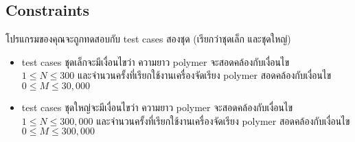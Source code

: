 \subsection*{\sectionfont\upshape Constraints}

โปรแกรมของคุณจะถูกทดสอบกับ test cases สองชุด (เรียกว่าชุดเล็ก และชุดใหญ่)
\begin{itemize}
\item test cases ชุดเล็กจะมีเงื่อนไขว่า ความยาว polymer จะสอดคล้องกับเงื่อนไข \\
    $1 \leq N \leq 300$ 
    และจำนวนครั้งที่เรียกใช้งานเครื่องจัดเรียง polymer 
    สอดคล้องกับเงื่อนไข $0 \leq M \leq 30,\!000$
\item test cases ชุดใหญ่จะมีเงื่อนไขว่า ความยาว polymer จะสอดคล้องกับเงื่อนไข \\
    $1 \leq N \leq 300,\!000$ 
    และจำนวนครั้งที่เรียกใช้งานเครื่องจัดเรียง polymer 
    สอดคล้องกับเงื่อนไข $0 \leq M \leq 300,\!000$
\end{itemize}
